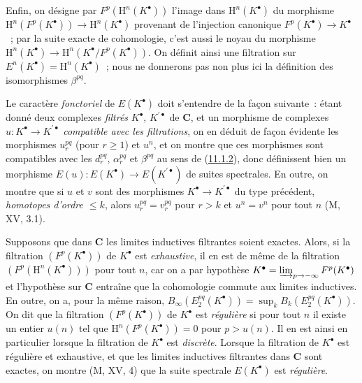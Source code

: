 \begin{env}[11.2.2]
Enfin, on désigne par $F^p(\mathrm H^n(K^\bullet))$ l'image dans
$\mathrm H^n(K^\bullet)$ du morphisme
$\mathrm H^n(F^p(K^\bullet))\to\mathrm H^n(K^\bullet)$ provenant de
l'injection canonique $F^p(K^\bullet)\to K^\bullet$~; par la suite exacte de
cohomologie, c'est aussi le noyau du morphisme
$\mathrm H^n(K^\bullet)\to\mathrm H^n(K^\bullet/F^p(K^\bullet))$. On
définit ainsi une filtration sur
$E^n(K^\bullet)=\mathrm H^n(K^\bullet)$~; nous ne donnerons pas non plus ici
la définition des isomorphismes $\beta^{pq}$.
\end{env}

\begin{env}[11.2.3]
\label{0.11.2.3-fr}
Le caractère \emph{fonctoriel} de $E(K^\bullet)$ doit s'entendre de la façon
suivante~: étant donné deux complexes \emph{filtrés} $K^\bullet$,
$K^{\prime\bullet}$ de $\boldsymbol{C}$, et un morphisme de complexes
$u:K^\bullet\to K^{\prime\bullet}$ \emph{compatible avec les filtrations}, on
en déduit de façon évidente les morphismes $u_r^{pq}$ (pour $r\geq1$) et
$u^n$, et on montre que ces morphismes sont compatibles avec les $d_r^{pq}$,
$\alpha_r^{pq}$ et $\beta^{pq}$ au sens de
(\hyperref[0.11.1.2-fr]{11.1.2}), donc définissent bien un morphisme
$E(u):E(K^\bullet)\to E(K^{\prime\bullet})$ de suites spectrales. En outre,
on montre que si $u$ et $v$ sont des morphismes
$K^\bullet\to K^{\prime\bullet}$ du type précédent, \emph{homotopes d'ordre
$\leq k$}, alors $u_r^{pq}=v_r^{pq}$ pour $r>k$ et $u^n=v^n$ pour tout $n$
(M, XV, 3.1).
\end{env}

\begin{env}[11.2.4]
\label{0.11.2.4-fr}
Supposons que dans $\boldsymbol{C}$ les limites inductives filtrantes soient
exactes. Alors, si la filtration $(F^p(K^\bullet))$ de $K^\bullet$ est
\emph{exhaustive}, il en est de même de la filtration
$(F^p(\mathrm H^n(K^\bullet)))$ pour tout $n$, car on a par hypothèse
$K^\bullet=\varinjlim_{p\to-\infty}F^p(K^\bullet)$ et l'hypothèse sur
$\boldsymbol{C}$ entraîne que la cohomologie commute aux limites inductives. En
outre, on a, pour la même raison,
$B_\infty(E_2^{pq}(K^\bullet))=\sup_k B_k(E_2^{pq}(K^\bullet))$. On dit que
la filtration $(F^p(K^\bullet))$ de $K^\bullet$ est \emph{régulière} si pour
tout $n$ il existe un entier $u(n)$ tel que
$\mathrm H^n(F^p(K^\bullet))=0$ pour $p>u(n)$. Il en est ainsi en particulier
lorsque la filtration de $K^\bullet$ est \emph{discrète}. Lorsque la
filtration de $K^\bullet$ est régulière et exhaustive, et que les limites
inductives filtrantes dans $\boldsymbol{C}$ sont exactes, on montre (M, XV, 4)
que la suite spectrale $E(K^\bullet)$ est \emph{régulière}.
\end{env}

